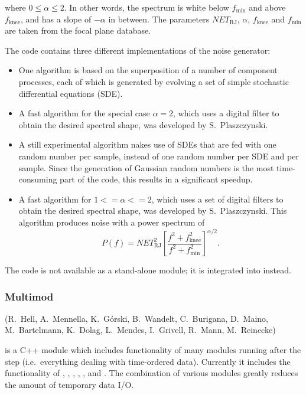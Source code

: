 where $0\leq \alpha \leq 2$.
In other words, the spectrum is white below $f_\mathrm{min}$ and above
$f_\mathrm{knee}$, and has a slope of $-\alpha$ in between. The parameters
$NET_\mathrm{RJ}$, $\alpha$, $f_\mathrm{knee}$ and $f_\mathrm{min}$ are
taken from the focal plane database.

The code contains three different implementations of the noise generator:
\begin{itemize}
  \item One algorithm is based on the superposition of a number of component
    processes, each of which is generated by evolving a set of simple
    stochastic differential equations (SDE).
  \item A fast algorithm for the special case $\alpha=2$, which uses a
    digital filter to obtain the desired spectral shape,
    was developed by S.~Plaszczynski.
  \item A still experimental algorithm nakes use of SDEs that are fed
    with one random number per sample, instead of one random number
    per SDE and per sample. Since the generation of Gaussian random numbers
    is the most time-consuming part of the code, this results in a significant
    speedup.
  \item A fast algorithm for $1<=\alpha<=2$, which uses a set of
    digital filters to obtain the desired spectral shape,
    was developed by S.~Plaszczynski. This algorithm produces noise with a
    power spectrum of
    \[P(f) = NET_\mathrm{RJ}^2 \left[ \frac{f^2+f_\mathrm{knee}^2}{f^2+f_\mathrm{min}^2} \right]^{\alpha/2}.\]
\end{itemize}

The code is not available as a stand-alone module; it is integrated into
 instead.

\subsubsection{Multimod}
(R.~Hell, A.~Mennella,
 K.~G\'orski, B.~Wandelt, C.~Burigana, D.~Maino,
 M.~Bartelmann, K.~Dolag, L.~Mendes, I.~Grivell, R.~Mann,
 M.~Reinecke)

 is a C++ module which includes functionality of many modules
running after the  step (i.e.\ everything dealing with
time-ordered data). Currently it includes the functionality of
, , , ,
,  and .
The combination of various modules greatly reduces the amount of temporary
data I/O.


